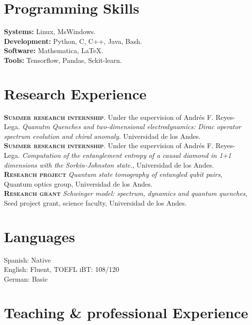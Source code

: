 \documentclass[11pt, a4paper]{article}
\newcommand{\years}[1]{\marginnote{\scriptsize #1}}
\begin{document}
\section*{\textcolor{BrickRed}{Programming Skills}}
\textbf{Systems:} Linux, MsWindows.\\  \textbf{Development:} Python, C, C++, Java, Bash.\\
\textbf{Software:} Mathematica, \LaTeX.\\ \textbf{Tools:} Tensorflow, Pandas, Sckit-learn.
\newpage
\section*{\textcolor{BrickRed}{Research Experience}}
\years{2018} \textbf{\textsc{Summer research internship}}. Under the supervision of Andrés F. Reyes-Lega. \textit{Quanutm Quenches and two-dimensional electrodynamics: Dirac operator spectrum evolution and chiral anomaly.} Universidad de los Andes.\\
\years{2017} \textbf{\textsc{Summer research internship}}. Under the supervision of Andrés F. Reyes-Lega. \textit{Computation of the entanglement entropy of a causal diamond in 1+1 dimensions with the Sorkin-Johnston state.}, Universidad de los Andes.\\
\years{2017}\textbf{\textsc{Research project}} \emph{Quantum state tomography of entangled qubit pairs}, Quantum optics group, Universidad de los Andes.\\
\years{2018} \textbf{\textsc{Research grant}} \emph{Schwinger model: spectrum, dynamics and quantum quenches}, Seed project grant, science faculty, Universidad de los Andes.



\section*{\textcolor{BrickRed}{Languages}}
Spanish: Native \\ 
English: Fluent, \textsc{TOEFL iBT:} 108/120 \\
German: Basic

 
\section*{\textcolor{BrickRed}{Teaching \& professional Experience}}
\end{document}
